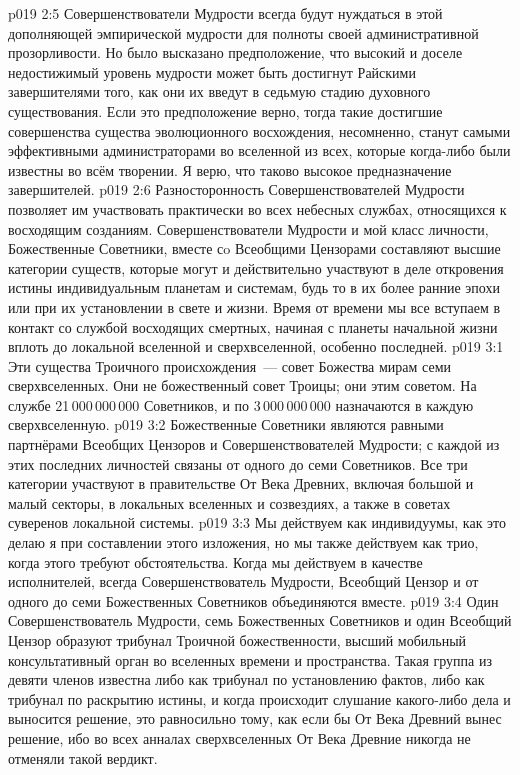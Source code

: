 \vs p019 2:5 Совершенствователи Мудрости всегда будут нуждаться в этой дополняющей эмпирической мудрости для полноты своей административной прозорливости. Но было высказано предположение, что высокий и доселе недостижимый уровень мудрости может быть достигнут Райскими завершителями  того, как они их введут в седьмую стадию духовного существования. Если это предположение верно, тогда такие достигшие совершенства существа эволюционного восхождения, несомненно, станут самыми эффективными администраторами во вселенной из всех, которые когда\hyp{}либо были известны во всём творении. Я верю, что таково высокое предназначение завершителей.
\vs p019 2:6 \pc Разносторонность Совершенствователей Мудрости позволяет им участвовать практически во всех небесных службах, относящихся к восходящим созданиям. Совершенствователи Мудрости и мой класс личности, Божественные Советники, вместе сo Всеобщими Цензорами составляют высшие категории существ, которые могут и действительно участвуют в деле откровения истины индивидуальным планетам и системам, будь то в их более ранние эпохи или при их установлении в свете и жизни. Время от времени мы все вступаем в контакт со службой восходящих смертных, начиная с планеты начальной жизни вплоть до локальной вселенной и сверхвселенной, особенно последней.
\vs p019 3:1 Эти существа Троичного происхождения~--- совет Божества мирам семи сверхвселенных. Они не  божественный совет Троицы; они  этим советом. На службе 21\,000\,000\,000 Советников, и по 3\,000\,000\,000 назначаются в каждую сверхвселенную.
\vs p019 3:2 Божественные Советники являются равными партнёрами Всеобщих Цензоров и Совершенствователей Мудрости; с каждой из этих последних личностей связаны от одного до семи Советников. Все три категории участвуют в правительстве От Века Древних, включая большой и малый секторы, в локальных вселенных и созвездиях, а также в советах суверенов локальной системы.
\vs p019 3:3 Мы действуем как индивидуумы, как это делаю я при составлении этого изложения, но мы также действуем как трио, когда этого требуют обстоятельства. Когда мы действуем в качестве исполнителей, всегда Совершенствователь Мудрости, Всеобщий Цензор и от одного до семи Божественных Советников объединяются вместе.
\vs p019 3:4 \pc Один Совершенствователь Мудрости, семь Божественных Советников и один Всеобщий Цензор образуют трибунал Троичной божественности, высший мобильный консультативный орган во вселенных времени и пространства. Такая группа из девяти членов известна либо как трибунал по установлению фактов, либо как трибунал по раскрытию истины, и когда происходит слушание какого\hyp{}либо дела и выносится решение, это равносильно тому, как если бы От Века Древний вынес решение, ибо во всех анналах сверхвселенных От Века Древние никогда не отменяли такой вердикт.
